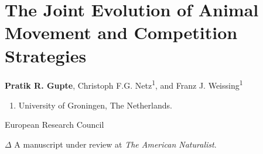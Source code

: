 
\chapter{The Joint Evolution of Animal Movement and Competition Strategies}\label{ch:kleptomove}

{\noindent \textbf{Pratik R. Gupte}, Christoph F.G. Netz\textsuperscript{1}, and Franz J. Weissing\textsuperscript{1}}

    \medskip

    {\normalsize{}}
    
    \begin{enumerate}
        \item University of Groningen, The Netherlands.
    \end{enumerate}
    
    \medskip

    {\normalsize{}}

    European Research Council

    \bigskip

    {\noindent \large{$\Delta$}} A manuscript under review at \textit{The American Naturalist}.


\clearpage

